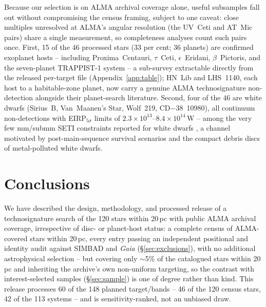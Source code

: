 \documentclass{openjournal}
\begin{document}
Because our selection is on ALMA archival coverage alone, useful
subsamples fall out without compromising the census framing, subject
to one caveat: close multiples unresolved at ALMA's angular
resolution (the UV~Ceti and AT~Mic pairs) share a single measurement,
so completeness analyses count such pairs once. First, 15 of the 46
processed stars (33 per cent; 36 planets) are confirmed exoplanet
hosts -- including Proxima~Centauri, $\tau$~Ceti,
$\epsilon$~Eridani, $\beta$~Pictoris, and the seven-planet TRAPPIST-1
system -- a sub-survey extractable directly from
the released per-target file (Appendix~\ref{app:table}); HN~Lib and LHS~1140, each host to a
habitable-zone planet, now carry a genuine ALMA technosignature
non-detection alongside their planet-search literature. Second, four
of the 46 are white dwarfs (Sirius~B, Van~Maanen's Star, Wolf~219,
CD$-$38~10980), all continuum non-detections with EIRP$_{5\sigma}$
limits of $2.3\times10^{13}$--$8.4\times10^{14}$\,W -- among the very
few mm/submm SETI constraints reported for white dwarfs
\citep{PollutedWD2026}, a channel motivated by post-main-sequence
survival scenarios and the compact debris discs of metal-polluted
white dwarfs.

\section{Conclusions}
\label{sec:conclusions}

We have described the design, methodology, and processed release of a
technosignature search of the 120 stars within 20\,pc with public
ALMA archival coverage, irrespective of disc- or planet-host status:
a complete census of ALMA-covered stars within 20\,pc, every entry
passing an independent positional and identity audit against SIMBAD
and \emph{Gaia} (\S\ref{sec:exclusions}), with no additional
astrophysical selection -- but covering only $\sim$5\% of the
catalogued stars within 20\,pc and inheriting the archive's own
non-uniform targeting, so the contrast with interest-selected samples
(\S\ref{sec:sample}) is one of degree rather than kind. This release
processes 60 of the 148 planned target/bands -- 46 of the 120 census
stars, 42 of the 113 systems -- and is sensitivity-ranked, not an
unbiased draw.
\end{document}
